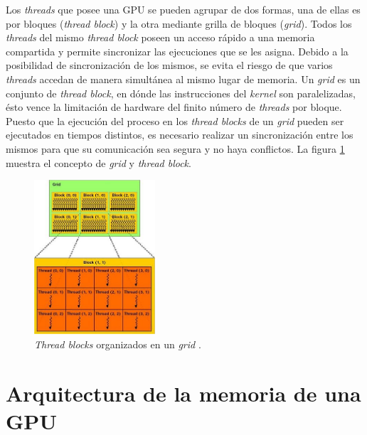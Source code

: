 Los \textit{threads} que posee una GPU se pueden agrupar de dos formas, una de ellas es por bloques (\textit{thread block}) y la otra mediante grilla de bloques (\textit{grid}). Todos los \textit{threads} del mismo \textit{thread block} poseen un acceso rápido a una memoria compartida y permite sincronizar las ejecuciones que se les asigna. Debido a la posibilidad de sincronización de los mismos, se evita el riesgo de que varios \textit{threads} accedan de manera simultánea al mismo lugar de memoria. Un \textit{grid} es un conjunto de \textit{thread block}, en dónde las instrucciones del \textit{kernel} son paralelizadas, ésto vence la limitación de hardware del finito número de \textit{threads} por bloque. Puesto que la ejecución del proceso en los \textit{thread blocks} de un \textit{grid} pueden ser ejecutados en tiempos distintos, es necesario realizar un sincronización entre los mismos para que su comunicación sea segura y no haya conflictos\cite{tolke2010implementation}. La figura \ref{fig:block_grid_threads} muestra el concepto de \textit{grid} y \textit{thread block}.

\newpage
\begin{figure}[h!]
	\centering
	\includegraphics[width=0.4\textwidth]{figs/cap3/threads_block_grid.jpg}
	\caption{\textit{Thread blocks} organizados en un \textit{grid} \cite{rinaldi2011modelos}.}
	\label{fig:block_grid_threads}
\end{figure}



\section{Arquitectura de la memoria de una GPU}

